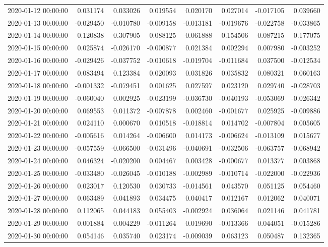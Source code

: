 \begin{tabular}{lrrrrrrr}
2020-01-12 00:00:00 & 0.031174 & 0.033026 & 0.019554 & 0.020170 & 0.027014 & -0.017105 & 0.039660 \\
2020-01-13 00:00:00 & -0.029450 & -0.010780 & -0.009158 & -0.013181 & -0.019676 & -0.022758 & -0.033865 \\
2020-01-14 00:00:00 & 0.120838 & 0.307905 & 0.088125 & 0.061888 & 0.154506 & 0.087215 & 0.177075 \\
2020-01-15 00:00:00 & 0.025874 & -0.026170 & -0.000877 & 0.021384 & 0.002294 & 0.007980 & -0.003252 \\
2020-01-16 00:00:00 & -0.029426 & -0.037752 & -0.010618 & -0.019704 & -0.011684 & 0.037500 & -0.012534 \\
2020-01-17 00:00:00 & 0.083494 & 0.123384 & 0.020093 & 0.031826 & 0.035832 & 0.080321 & 0.060163 \\
2020-01-18 00:00:00 & -0.001332 & -0.079451 & 0.001625 & 0.027597 & 0.023120 & 0.029740 & -0.028703 \\
2020-01-19 00:00:00 & -0.060040 & 0.002925 & -0.023199 & -0.036730 & -0.040193 & -0.053069 & -0.026342 \\
2020-01-20 00:00:00 & 0.069553 & 0.011372 & -0.007878 & 0.002460 & -0.001677 & 0.025925 & -0.009886 \\
2020-01-21 00:00:00 & 0.024110 & 0.000670 & 0.010518 & -0.018814 & 0.014702 & -0.007804 & 0.005605 \\
2020-01-22 00:00:00 & -0.005616 & 0.014264 & -0.006600 & 0.014173 & -0.006624 & -0.013109 & 0.015677 \\
2020-01-23 00:00:00 & -0.057559 & -0.066500 & -0.031496 & -0.040691 & -0.032506 & -0.063757 & -0.068942 \\
2020-01-24 00:00:00 & 0.046324 & -0.020200 & 0.004467 & 0.003428 & -0.000677 & 0.013377 & 0.003868 \\
2020-01-25 00:00:00 & -0.033480 & -0.026045 & -0.010188 & -0.002989 & -0.010714 & -0.022000 & -0.022936 \\
2020-01-26 00:00:00 & 0.023017 & 0.120530 & 0.030733 & -0.014561 & 0.043570 & 0.051125 & 0.054460 \\
2020-01-27 00:00:00 & 0.063489 & 0.041893 & 0.034475 & 0.040417 & 0.012167 & 0.012062 & 0.040071 \\
2020-01-28 00:00:00 & 0.112065 & 0.044183 & 0.055403 & -0.002924 & 0.036064 & 0.021146 & 0.041781 \\
2020-01-29 00:00:00 & 0.001884 & 0.004229 & -0.011264 & 0.019690 & -0.013366 & 0.044051 & -0.015286 \\
2020-01-30 00:00:00 & 0.054146 & 0.035740 & 0.023174 & -0.009039 & 0.063123 & 0.050487 & 0.132365 \\

\end{tabular}
